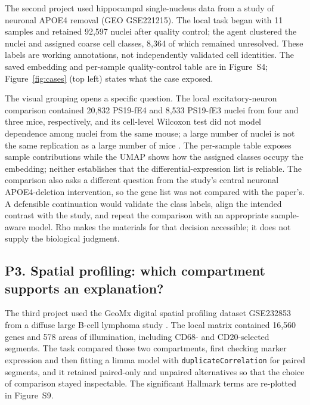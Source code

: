 \documentclass[11pt]{article}
\begin{document}
The second project used hippocampal single-nucleus data from a study of neuronal APOE4 removal \cite{koutsodendris2023} (GEO GSE221215). The local task began with 11 samples and retained 92,597 nuclei after quality control; the agent clustered the nuclei and assigned coarse cell classes, 8,364 of which remained unresolved. These labels are working annotations, not independently validated cell identities. The saved embedding and per-sample quality-control table are in Figure~S4; Figure~\ref{fig:cases} (top left) states what the case exposed.

The visual grouping opens a specific question. The local excitatory-neuron comparison contained 20,832 PS19-fE4 and 8,533 PS19-fE3 nuclei from four and three mice, respectively, and its cell-level Wilcoxon test did not model dependence among nuclei from the same mouse; a large number of nuclei is not the same replication as a large number of mice \cite{squair2021}. The per-sample table exposes sample contributions while the UMAP shows how the assigned classes occupy the embedding; neither establishes that the differential-expression list is reliable. The comparison also asks a different question from the study's central neuronal APOE4-deletion intervention, so the gene list was not compared with the paper's. A defensible continuation would validate the class labels, align the intended contrast with the study, and repeat the comparison with an appropriate sample-aware model. Rho makes the materials for that decision accessible; it does not supply the biological judgment.

\FloatBarrier

\subsection{P3. Spatial profiling: which compartment supports an explanation?}\label{p3}

The third project used the GeoMx digital spatial profiling dataset GSE232853 from a diffuse large B-cell lymphoma study \cite{liu2024}. The local matrix contained 16,560 genes and 578 areas of illumination, including CD68- and CD20-selected segments. The task compared those two compartments, first checking marker expression and then fitting a limma model with \texttt{duplicateCorrelation} for paired segments, and it retained paired-only and unpaired alternatives so that the choice of comparison stayed inspectable. The significant Hallmark terms are re-plotted in Figure~S9.
\end{document}
